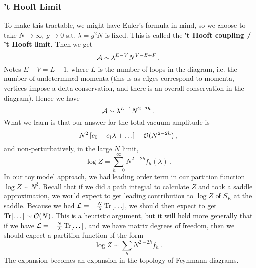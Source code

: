 \documentclass{article}
\begin{document}
\subsubsection{'t Hooft Limit}
To make this tractable, we might have Euler's formula in mind, so we choose to take $N \to \infty, \, g \to 0$ s.t. $\lambda = g^2 N $ is fixed. This is called the \textbf{'t Hooft coupling / 't Hooft limit}. Then we get 
\[
\mathcal{A} \sim \lambda^{E-V} N^{V-E+F} \, .
\] 
Notes $E-V = L-1$, where $L$ is the number of loops in the diagram, i.e. the number of undetermined momenta (this is as edges correspond to momenta, vertices impose a delta conservation, and there is an overall conservation in the diagram). Hence we have 
\[
\mathcal{A} \sim \lambda^{L-1} N^{2-2h} \, . 
\]
What we learn is that our answer for the total vacuum amplitude is 
\[
N^2 \psquare{c_0 + c_1 \lambda + \dots} + \mathcal{O}(N^{2-2h}) \, ,
\]
and non-perturbatively, in the large $N$ limit, 
\[
\log Z = \sum_{h = 0}^\infty N^{2-2h} f_h(\lambda) \, .
\]
In our toy model approach, we had leading order term in our partition function $\log Z \sim N^2$. Recall that if we did a path integral to calculate $Z$ and took a saddle approximation, we would expect to get leading contribution to $\log Z$ of $S_E$ at the saddle. Because we had $\mc{L} = -\frac{N}{\lambda} \tr\psquare{\dots}$, we should then expect to get $\operatorname{Tr}[\dots] \sim \mathcal{O}(N)$. This is a heuristic argument, but it will hold more generally that if we have $\mathcal{L} = -\frac{N}{\lambda}\operatorname{Tr}[\dots]$, and we have matrix degrees of freedom, then we should expect a partition function of the form 
\[
\log Z \sim \sum_h N^{2-2h} f_h \, . 
\] 
The expansion becomes an expansion in the topology of Feynmann diagrams. 

\end{document}
